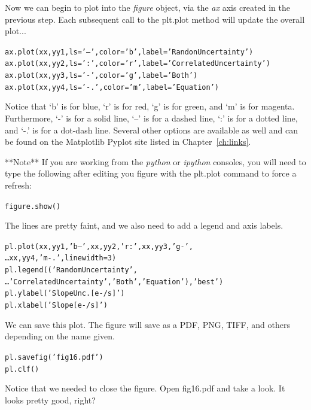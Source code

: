 Now we can begin to plot into the \textit{figure} object, via the \textit{ax} 
axis created in the previous step. Each subsequent call to the plt.plot 
method will update the overall plot... 

\begin{alltt}
\pytab ax.plot(xx, yy1, ls='--', color='b', label='Randon Uncertainty')
\pytab ax.plot(xx, yy2, ls=':', color='r', label='Correlated Uncertainty')
\pytab ax.plot(xx, yy3, ls='-', color='g', label='Both')
\pytab ax.plot(xx, yy4, ls='-.', color='m', label='Equation')
\end{alltt}

Notice that `b' is for blue, `r' is for red, `g' is for green, and `m'
is for magenta.  Furthermore, `-' is for a solid line, `--' is for a
dashed line, `:' is for a dotted line, and `-.' is for a dot-dash
line.  Several other options are available as well and can be found on
the Matplotlib Pyplot site listed in Chapter~\ref{ch:links}.

**Note** If you are working from the 
\textit{python} or \textit{ipython} consoles, you will need to type the following 
after editing you figure with the plt.plot command to force a refresh:
\begin{alltt}
\pytab figure.show()
\end{alltt}

The lines are pretty faint, and we also need to add a legend and axis
labels.

\begin{alltt}
\pytab pl.plot(xx,yy1,'b--',xx,yy2,'r:',xx,yy3,'g-',  
\ldots      xx,yy4,'m-.',linewidth=3) 
\pytab pl.legend(('Random Uncertainty',  
\ldots      'Correlated Uncertainty', 'Both','Equation'),'best') 
\pytab pl.ylabel('Slope Unc. [e-/s]')
\pytab pl.xlabel('Slope [e-/s]')
\end{alltt}

We can save this plot.  The figure will save as a PDF, PNG, TIFF, and
others depending on the name given.

\begin{alltt}
\pytab pl.savefig('fig16.pdf')
\pytab pl.clf()
\end{alltt}

Notice that we needed to close the figure.  Open fig16.pdf and take a
look.  It looks pretty good, right?  

